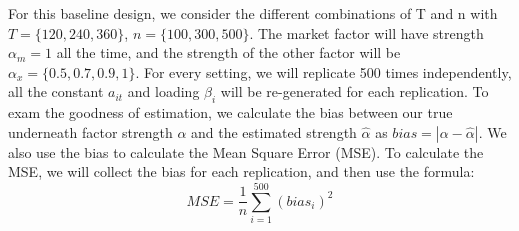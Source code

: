 \documentclass[12pt]{article}
\begin{document}


For this baseline design, we consider the different combinations of T and n with $T = \{120, 240, 360\}$, $n =\{100, 300, 500\} $.
The market factor will have strength $\alpha_m = 1$ all the time, and the strength of the other factor will be $\alpha_{x} = \{0.5, 0.7, 0.9,1\}$. For every setting, we will replicate 500 times independently, all the constant $a_{it}$ and loading $\beta_i$ will be re-generated for each replication.
To exam the goodness of estimation, we calculate the bias between our true underneath factor strength $\alpha$ and the estimated strength $\hat{\alpha}$ as $ bias = |\alpha - \hat{\alpha}|$. 
We also use the bias to calculate the Mean Square Error (MSE).
To calculate the MSE, we will collect the bias for each replication, and then use the formula: 
\[ MSE =\frac{1}{n}\sum_{i=1}^{500}(bias_i)^2 \]
\end{document}
